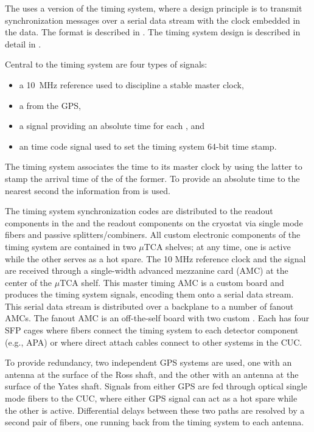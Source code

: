 The   uses a version of the  timing
system, where a design principle is to transmit synchronization messages over
a serial data stream with the clock embedded in the data. The format
is described in . The timing system design is
described in detail in .

Central to the timing system are four types of signals:
\begin{itemize}
\item a \SI{10}{\mega\hertz} reference used to discipline a stable master clock,
\item a  from the GPS,
\item a  signal providing an absolute time for each , and
\item an  time code signal
  used to set the timing system 64-bit time stamp.
\end{itemize}
The timing system associates the  time to its master clock by using the latter to stamp the arrival time of the  of the former.
To provide an absolute time to the nearest second the information from  is used.

The timing system synchronization codes are distributed to the  readout components in the  and the readout components on the cryostat via single mode fibers and passive splitters/combiners.
All custom electronic components of the timing system are contained in two $\mu$TCA shelves; at any time, one is active while the other serves as a hot spare.
The 10 MHz reference clock and the  signal are received through a single-width advanced mezzanine card (AMC) at the center of the $\mu$TCA shelf.
This master timing AMC is a custom board and produces the timing system signals, encoding them onto a serial data stream.
This serial data stream is distributed over a backplane to a number of fanout AMCs.
The fanout AMC is an off-the-self board with two custom .
Each  has four SFP cages where fibers connect the timing system to each detector component (e.g., APA) or where direct attach cables connect to other systems in the CUC.

To provide redundancy, two independent GPS systems are used,
one with an antenna at the surface of the Ross shaft, and the other
with an antenna at the surface of the Yates shaft. Signals from either
GPS are fed through optical single mode fibers to the CUC, where
either GPS signal can act as a hot spare while the other is active. 
Differential delays between these two paths are resolved by a second pair of fibers, one running back from the timing system to each antenna.

